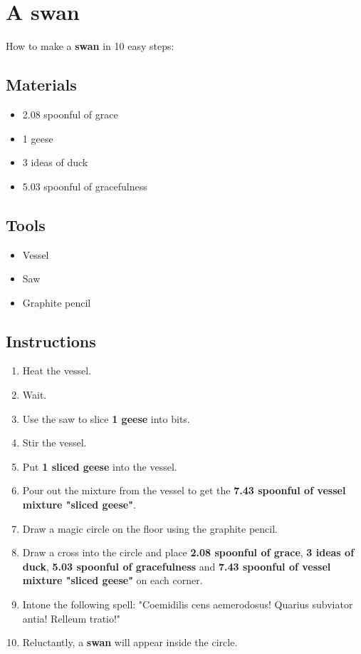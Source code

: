 \documentclass{article}
\begin{document}
\section{A swan}How to make a \textbf{swan} in 10 easy steps:

\subsection{Materials}\begin{itemize}
\item 
2.08 spoonful of grace
\item 
1 geese
\item 
3 ideas of duck
\item 
5.03 spoonful of gracefulness
\end{itemize}
\subsection{Tools}\begin{itemize}
\item 
Vessel
\item 
Saw
\item 
Graphite pencil
\end{itemize}
\subsection{Instructions}\begin{enumerate}
\item 
Heat the vessel.
\item 
Wait.
\item 
Use the saw to slice \textbf{1 geese} into bits.
\item 
Stir the vessel.
\item 
Put \textbf{1 sliced geese} into the vessel.
\item 
Pour out the mixture from the vessel to get the \textbf{7.43 spoonful of vessel mixture "sliced geese"}.
\item 
Draw a magic circle on the floor using the graphite pencil.
\item 
Draw a cross into the circle and place \textbf{2.08 spoonful of grace}, \textbf{3 ideas of duck}, \textbf{5.03 spoonful of gracefulness} and \textbf{7.43 spoonful of vessel mixture "sliced geese"} on each corner.
\item 
Intone the following spell: "Coemidilis cens aemerodosus! Quarius subviator antia! Relleum tratio!"
\item 
Reluctantly, a \textbf{swan} will appear inside the circle.
\end{enumerate}
\newpage
\end{document}

